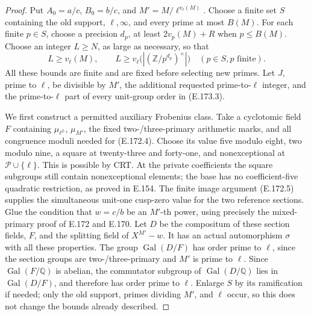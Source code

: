 \begin{proof}
Put \(A_0=a/c\), \(B_0=b/c\), and
\(M'=M/\ell^{v_\ell(M)}\). Choose a finite set \(S\)
containing the old support, \(\ell,\infty\), and every prime
at most \(B(M)\). For each finite \(p\in S\), choose a
precision \(d_p\), at least \(2v_p(M)+R\) when
\(p\le B(M)\). Choose an integer \(L\ge N\), as large as
necessary, so that
\[
 L\ge v_\ell(M),\qquad
 L\ge v_\ell\bigl(|(\mathbb Z/p^{d_p})^\times|\bigr)
                 \quad(p\in S, p\text{ finite}).
 \tag{E.173.3}
\]
All these bounds are finite and are fixed before selecting new
primes. Let \(J\), prime to \(\ell\), be divisible by
\(M'\), the additional requested prime-to-\(\ell\) integer,
and the prime-to-\(\ell\) part of every unit-group order in
(E.173.3).

We first construct a permitted auxiliary Frobenius class.
Take a cyclotomic field \(F\) containing \(\mu_{\ell^L}\),
\(\mu_{M'}\), the fixed two-/three-primary arithmetic marks,
and all congruence moduli needed for (E.172.4).
Choose its value five modulo eight, two modulo nine, a square
at twenty-three and forty-one, and nonexceptional at
\(\mathcal P\cup\{\ell\}\). This is possible by CRT.
At the private coefficients the square subgroups still contain
nonexceptional elements; the base has no coefficient-five
quadratic restriction, as proved in E.154.
The finite image argument (E.172.5) supplies the simultaneous
unit-one cusp-zero value for the two reference sections.
Glue the condition that \(w=c/b\) be an \(M'\)-th power,
using precisely the mixed-primary proof of E.172 and E.170.
Let \(D\) be the compositum of these section fields, \(F\),
and the splitting field of \(X^{M'}-w\).
It has an actual automorphism \(\sigma\) with all these
properties. The group \(\operatorname{Gal}(D/F)\) has order
prime to \(\ell\), since the section groups are
two-/three-primary and \(M'\) is prime to \(\ell\).
Since \(\operatorname{Gal}(F/\mathbb Q)\) is abelian,
the commutator subgroup of \(\operatorname{Gal}(D/\mathbb Q)\)
lies in \(\operatorname{Gal}(D/F)\), and therefore has
order prime to \(\ell\).
Enlarge \(S\) by its ramification if needed; only the old
support, primes dividing \(M'\), and \(\ell\) occur, so this
does not change the bounds already described.


\end{proof}
